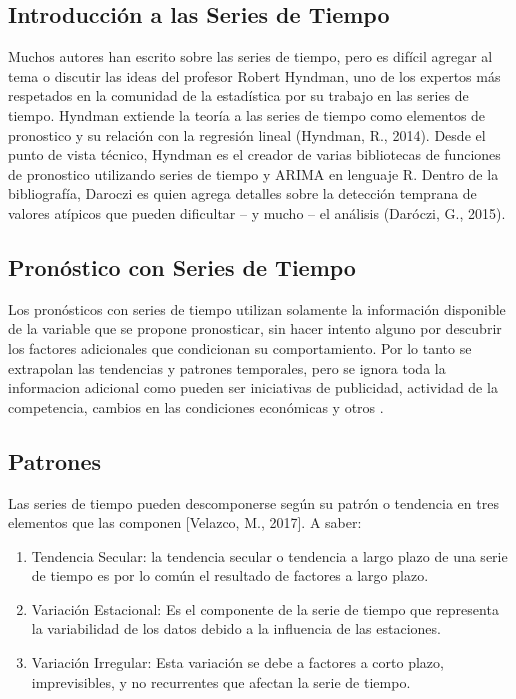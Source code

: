 \documentclass[letterpaper, spanish, 11pt]{report}
\begin{document}
\subsection{Introducción a las Series de Tiempo}
Muchos autores han escrito sobre las series de tiempo, pero es difícil agregar al tema o discutir las ideas del profesor Robert Hyndman, uno de los expertos más respetados en la comunidad de la estadística por su trabajo en las series de tiempo. Hyndman extiende la teoría a las series de tiempo como elementos de pronostico y su relación con la regresión lineal (Hyndman, R., 2014). Desde el punto de vista técnico, Hyndman es el creador de varias bibliotecas de funciones de pronostico utilizando series de tiempo y ARIMA en lenguaje R. Dentro de la bibliografía, Daroczi es quien agrega detalles sobre la detección temprana de valores atípicos que pueden dificultar – y mucho – el análisis (Daróczi, G., 2015). 

\subsection{Pronóstico con Series de Tiempo}
Los pronósticos con series de tiempo utilizan solamente la información disponible de la variable que se propone pronosticar, sin hacer intento alguno por descubrir los factores adicionales que condicionan su comportamiento. Por lo tanto se extrapolan las tendencias y patrones temporales, pero se ignora toda la informacion adicional como pueden ser iniciativas de publicidad, actividad de la competencia, cambios en las condiciones económicas y otros \cite{hyndman}.

\subsection{Patrones}
Las series de tiempo pueden descomponerse según su patrón o tendencia en tres elementos que las componen [Velazco, M., 2017]. A saber:

\begin{enumerate}
	\item Tendencia Secular: la tendencia secular o tendencia a largo plazo de una serie de tiempo es por lo común el resultado de factores a largo plazo. 
	\item Variación Estacional: Es el componente de la serie de tiempo que representa la variabilidad de los datos debido a la influencia de las estaciones.
	\item Variación Irregular: Esta variación se debe a factores a corto plazo, imprevisibles, y no recurrentes que afectan la serie de tiempo. 
\end{enumerate}
\end{document}
